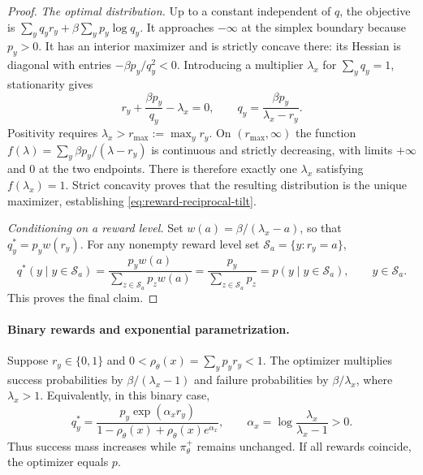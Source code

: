 \begin{proof}
\textit{The optimal distribution.}
Up to a constant independent of $q$, the objective is
$\sum_yq_yr_y+\beta\sum_yp_y\log q_y$.
It approaches $-\infty$ at the simplex boundary because $p_y>0$.
It has an interior maximizer and is strictly concave there: its Hessian
is diagonal with entries $-\beta p_y/q_y^2<0$.
Introducing a multiplier $\lambda_x$ for $\sum_yq_y=1$, stationarity gives
\begin{equation}
 r_y+\frac{\beta p_y}{q_y}-\lambda_x=0,
 \qquad q_y=\frac{\beta p_y}{\lambda_x-r_y}.
 \label{eq:app-reward-forward-stationarity}
\end{equation}
Positivity requires $\lambda_x>r_{\max}:=\max_y r_y$.
On $(r_{\max},\infty)$ the function
$f(\lambda)=\sum_y\beta p_y/(\lambda-r_y)$ is continuous and strictly
decreasing, with limits $+\infty$ and $0$ at the two endpoints.
There is therefore exactly one $\lambda_x$ satisfying $f(\lambda_x)=1$.
Strict concavity proves that the resulting distribution is the unique
maximizer, establishing \eqref{eq:reward-reciprocal-tilt}.

\noindent\textit{Conditioning on a reward level.}
Set $w(a)=\beta/(\lambda_x-a)$, so that $q_y^*=p_yw(r_y)$.
For any nonempty reward level set
$\mathcal S_a=\{y:r_y=a\}$,
\begin{equation}
 q^*(y\mid y\in\mathcal S_a)
 =\frac{p_yw(a)}{\sum_{z\in\mathcal S_a}p_zw(a)}
 =\frac{p_y}{\sum_{z\in\mathcal S_a}p_z}
 =p(y\mid y\in\mathcal S_a),\qquad y\in\mathcal S_a.
 \label{eq:app-reward-conditional-invariance}
\end{equation}
This proves the final claim.
\end{proof}

\paragraph{Binary rewards and exponential parametrization.}
Suppose $r_y\in\{0,1\}$ and $0<\rho_\theta(x)=\sum_yp_yr_y<1$.
The optimizer multiplies success probabilities by
$\beta/(\lambda_x-1)$ and failure probabilities by $\beta/\lambda_x$,
where $\lambda_x>1$. Equivalently, in this binary case,
\begin{equation}
 q_y^*=\frac{p_y\exp(\alpha_xr_y)}
              {1-\rho_\theta(x)+\rho_\theta(x)e^{\alpha_x}},
 \qquad \alpha_x=\log\frac{\lambda_x}{\lambda_x-1}>0.
 \label{eq:app-reward-binary-tilt}
\end{equation}
Thus success mass increases while $\pi_\theta^+$ remains unchanged.
If all rewards coincide, the optimizer equals $p$.

